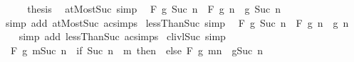 \begin{isabellebody}
\ \ \isamarkupfalse%
\ \isamarkupfalse%
\ {\isacharquery}{\kern0pt}thesis\ \isacommand{{\isachardot}{\kern0pt}}\isamarkupfalse%
\isanewline
{}\isamarkupfalse%
%
\endisatagproof
{\isafoldproof}%
%
\isadelimproof
\isanewline
%
\endisadelimproof
\isanewline
{}\isamarkupfalse%
\ atMost{\isacharunderscore}{\kern0pt}Suc\ {\isacharbrackleft}{\kern0pt}simp{\isacharbrackright}{\kern0pt}{\isacharcolon}{\kern0pt}\isanewline
\ \ {\isachardoublequoteopen}F\ g\ {\isacharbraceleft}{\kern0pt}{\isachardot}{\kern0pt}{\isachardot}{\kern0pt}Suc\ n{\isacharbraceright}{\kern0pt}\ {\isacharequal}{\kern0pt}\ F\ g\ {\isacharbraceleft}{\kern0pt}{\isachardot}{\kern0pt}{\isachardot}{\kern0pt}n{\isacharbraceright}{\kern0pt}\ \isactrlbold {\isacharasterisk}{\kern0pt}\ g\ {\isacharparenleft}{\kern0pt}Suc\ n{\isacharparenright}{\kern0pt}{\isachardoublequoteclose}\isanewline
%
\isadelimproof
\ \ %
\endisadelimproof
%
\isatagproof
{}\isamarkupfalse%
\ {\isacharparenleft}{\kern0pt}simp\ add{\isacharcolon}{\kern0pt}\ atMost{\isacharunderscore}{\kern0pt}Suc\ ac{\isacharunderscore}{\kern0pt}simps{\isacharparenright}{\kern0pt}%
\endisatagproof
{\isafoldproof}%
%
\isadelimproof
\isanewline
%
\endisadelimproof
\isanewline
{}\isamarkupfalse%
\ lessThan{\isacharunderscore}{\kern0pt}Suc\ {\isacharbrackleft}{\kern0pt}simp{\isacharbrackright}{\kern0pt}{\isacharcolon}{\kern0pt}\isanewline
\ \ {\isachardoublequoteopen}F\ g\ {\isacharbraceleft}{\kern0pt}{\isachardot}{\kern0pt}{\isachardot}{\kern0pt}{\isacharless}{\kern0pt}Suc\ n{\isacharbraceright}{\kern0pt}\ {\isacharequal}{\kern0pt}\ F\ g\ {\isacharbraceleft}{\kern0pt}{\isachardot}{\kern0pt}{\isachardot}{\kern0pt}{\isacharless}{\kern0pt}n{\isacharbraceright}{\kern0pt}\ \isactrlbold {\isacharasterisk}{\kern0pt}\ g\ n{\isachardoublequoteclose}\isanewline
%
\isadelimproof
\ \ %
\endisadelimproof
%
\isatagproof
{}\isamarkupfalse%
\ {\isacharparenleft}{\kern0pt}simp\ add{\isacharcolon}{\kern0pt}\ lessThan{\isacharunderscore}{\kern0pt}Suc\ ac{\isacharunderscore}{\kern0pt}simps{\isacharparenright}{\kern0pt}%
\endisatagproof
{\isafoldproof}%
%
\isadelimproof
\isanewline
%
\endisadelimproof
\isanewline
{}\isamarkupfalse%
\ cl{\isacharunderscore}{\kern0pt}ivl{\isacharunderscore}{\kern0pt}Suc\ {\isacharbrackleft}{\kern0pt}simp{\isacharbrackright}{\kern0pt}{\isacharcolon}{\kern0pt}\isanewline
\ \ {\isachardoublequoteopen}F\ g\ {\isacharbraceleft}{\kern0pt}m{\isachardot}{\kern0pt}{\isachardot}{\kern0pt}Suc\ n{\isacharbraceright}{\kern0pt}\ {\isacharequal}{\kern0pt}\ {\isacharparenleft}{\kern0pt}if\ Suc\ n\ {\isacharless}{\kern0pt}\ m\ then\ \ else\ F\ g\ {\isacharbraceleft}{\kern0pt}m{\isachardot}{\kern0pt}{\isachardot}{\kern0pt}n{\isacharbraceright}{\kern0pt}\ \isactrlbold {\isacharasterisk}{\kern0pt}\ g{\isacharparenleft}{\kern0pt}Suc\ n{\isacharparenright}{\kern0pt}{\isacharparenright}{\kern0pt}{\isachardoublequoteclose}\isanewline

\end{isabellebody}
